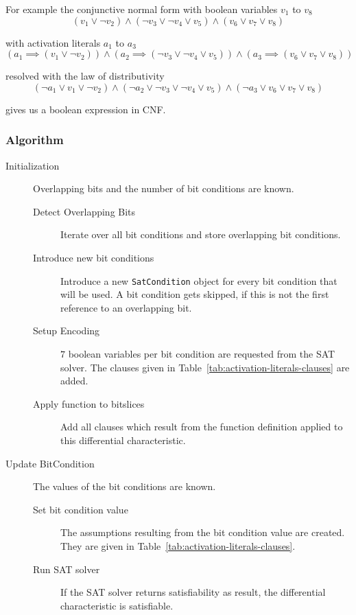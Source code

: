 For example the conjunctive normal form with boolean variables $v_1$ to $v_8$
%
\[
  (v_1 \lor \neg v_2) \land (\neg v_3 \lor \neg v_4 \lor v_5) \land
    (v_6 \lor v_7 \lor v_8)
\]

with activation literals $a_1$ to $a_3$
\[
  (a_1 \implies (v_1 \lor \neg v_2)) \land
    (a_2 \implies (\neg v_3 \lor \neg v_4 \lor v_5)) \land
    (a_3 \implies (v_6 \lor v_7 \lor v_8))
\]

resolved with the law of distributivity
\[
  (\neg a_1 \lor v_1 \lor \neg v_2) \land
    (\neg a_2 \lor \neg v_3 \lor \neg v_4 \lor v_5) \land
    (\neg a_3 \lor v_6 \lor v_7 \lor v_8)
\]

gives us a boolean expression in CNF.

\subsubsection{Algorithm}
\label{sec:activation-literals-algorithm}
%
\begin{description}
  \item[Initialization] Overlapping bits and the number of bit conditions are known.
    \begin{description}
      \item[Detect Overlapping Bits] Iterate over all bit conditions and store overlapping bit conditions.
      \item[Introduce new bit conditions] Introduce a new \texttt{SatCondition} object for every bit condition that will be used. A bit condition gets skipped, if this is not the first reference to an overlapping bit.
      \item[Setup Encoding] $7$ boolean variables per bit condition are requested from the SAT solver. The clauses given in Table~\ref{tab:activation-literals-clauses} are added.
      \item[Apply function to bitslices] Add all clauses which result from the function definition applied to this differential characteristic.
    \end{description}
  \item[Update BitCondition] The values of the bit conditions are known.
    \begin{description}
      \item[Set bit condition value] The assumptions resulting from the bit condition value are created. They are given in Table~\ref{tab:activation-literals-clauses}.
      \item[Run SAT solver] If the SAT solver returns satisfiability as result, the differential characteristic is satisfiable.
    \end{description}
\end{description}

